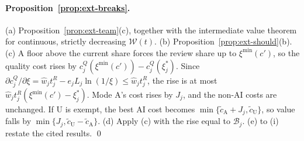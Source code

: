 \paragraph{Proposition~\ref{prop:ext-breaks}.} (a) Proposition~\ref{prop:ext-team}(c), together with the intermediate value theorem for continuous, strictly decreasing $\mathcal W(t)$. (b) Proposition~\ref{prop:ext-should}(b). (c) A floor above the current share forces the review share up to $\xi^{\min}(c')$, so the quality cost rises by $c^Q_j(\xi^{\min}(c'))-c^Q_j(\xi^*_j)$. Since $\partial c^Q_j/\partial\xi=\hat w_jt^R_j-e_jL_j\ln(1/\xi)\le\hat w_jt^R_j$, the rise is at most $\hat w_jt^R_j(\xi^{\min}(c')-\xi^*_j)$. Mode A's cost rises by $J_j$, and the non-AI costs are unchanged. If U is exempt, the best AI cost becomes $\min\{\tilde c_{\mathrm A}+J_j,\tilde c_{\mathrm U}\}$, so value falls by $\min\{J_j,\tilde c_{\mathrm U}-\tilde c_{\mathrm A}\}$. (d) Apply (c) with the rise equal to $\mathcal B_j$. (e) to (i) restate the cited results. \qed
